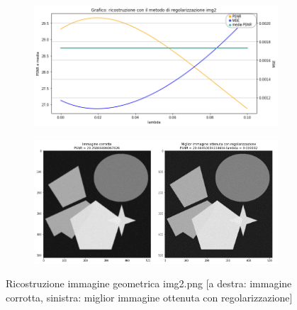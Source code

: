 \begin{figure}[H]
    \begin{subfigure}{0.5\textwidth}
        \includegraphics[width=\textwidth]{imgRicostruzione/grafico2minimize.png}
    \end{subfigure}%
    \begin{subfigure}{0.5\textwidth}
        \centering
        \includegraphics[width=\textwidth]{imgRicostruzione/ricostruzione2minimize.png}
    \end{subfigure}
    \caption{Ricostruzione immagine geometrica img2.png [a destra: immagine corrotta, sinistra: miglior immagine ottenuta con regolarizzazione]}
    

\end{figure}
